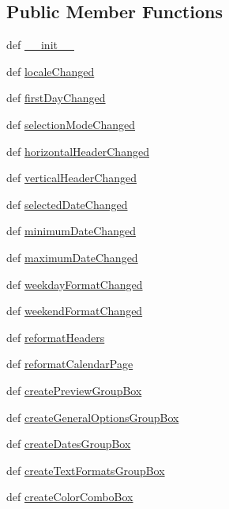 \subsection*{Public Member Functions}
\begin{DoxyCompactItemize}
\item 
def \hyperlink{classcalendarwidget_1_1Window_a7eee502b3fbb45552bb6952f4084909b}{\+\_\+\+\_\+init\+\_\+\+\_\+}
\item 
def \hyperlink{classcalendarwidget_1_1Window_a61a13e3d1113f0a37e5a753675d7c051}{locale\+Changed}
\item 
def \hyperlink{classcalendarwidget_1_1Window_ad300bd7377d6602ef62baca96b594a50}{first\+Day\+Changed}
\item 
def \hyperlink{classcalendarwidget_1_1Window_a2a1cacfd70c15780ef40780e6d3318b0}{selection\+Mode\+Changed}
\item 
def \hyperlink{classcalendarwidget_1_1Window_a64f1953f9353b689cb2383bdde34d0fa}{horizontal\+Header\+Changed}
\item 
def \hyperlink{classcalendarwidget_1_1Window_a018b83284dbd45ce24a125233b947d72}{vertical\+Header\+Changed}
\item 
def \hyperlink{classcalendarwidget_1_1Window_aaa9d9486fd0ccfc6d006d8872d655712}{selected\+Date\+Changed}
\item 
def \hyperlink{classcalendarwidget_1_1Window_a63036fba171e01b72937c4f779dda877}{minimum\+Date\+Changed}
\item 
def \hyperlink{classcalendarwidget_1_1Window_a8d401720ef0f5471f2ce7df352f0f099}{maximum\+Date\+Changed}
\item 
def \hyperlink{classcalendarwidget_1_1Window_a7bad2caf95b317434618053277b0d9dd}{weekday\+Format\+Changed}
\item 
def \hyperlink{classcalendarwidget_1_1Window_a3b5d46b351863031de313396d4050365}{weekend\+Format\+Changed}
\item 
def \hyperlink{classcalendarwidget_1_1Window_ae22cd4e165343a7fcf8ba1c99c7a3578}{reformat\+Headers}
\item 
def \hyperlink{classcalendarwidget_1_1Window_a9a2500d421d4171be09dc61d9fe75157}{reformat\+Calendar\+Page}
\item 
def \hyperlink{classcalendarwidget_1_1Window_aa761eada8bf6cc8b69b65f59abd92e37}{create\+Preview\+Group\+Box}
\item 
def \hyperlink{classcalendarwidget_1_1Window_acd052c3cc92ec05634f05e0ab8ba9a49}{create\+General\+Options\+Group\+Box}
\item 
def \hyperlink{classcalendarwidget_1_1Window_a1fec81d164001097aefadab2767f078b}{create\+Dates\+Group\+Box}
\item 
def \hyperlink{classcalendarwidget_1_1Window_ae16e6a54325931de139a85b236cc424b}{create\+Text\+Formats\+Group\+Box}
\item 
def \hyperlink{classcalendarwidget_1_1Window_ab64866c7bd4794e5795f751bcba2cf74}{create\+Color\+Combo\+Box}
\end{DoxyCompactItemize}
